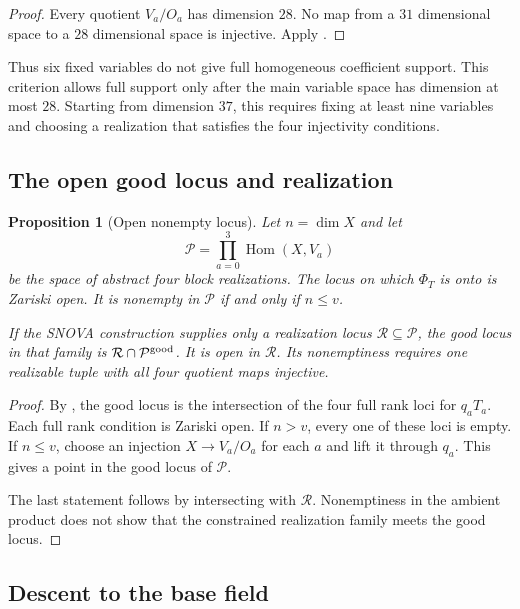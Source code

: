 \documentclass[11pt]{article}
\newcommand{\Hom}{\operatorname{Hom}}
\theoremstyle{plain}
\newtheorem{proposition}[theorem]{Proposition}
\theoremstyle{definition}
\theoremstyle{remark}
\begin{document}
\begin{proof}
Every quotient $V_a/O_a$ has dimension $28$.  No map from a
$31$ dimensional space to a $28$ dimensional space is injective.  Apply
.
\end{proof}

Thus six fixed variables do not give full homogeneous coefficient support.
This criterion allows full support only after the main variable space has
dimension at most $28$.  Starting from dimension $37$, this requires fixing
at least nine variables and choosing a realization that satisfies the four
injectivity conditions.

\subsection{The open good locus and realization}

\begin{proposition}[Open nonempty locus]
\label{prop:l4-open-locus}
Let $n=\dim X$ and let
\[
 \mathcal P=\prod_{a=0}^3\Hom(X,V_a)
\]
be the space of abstract four block realizations.  The locus on which
$\Phi_T$ is onto is Zariski open.  It is nonempty in $\mathcal P$ if and only
if $n\leq v$.

If the SNOVA construction supplies only a realization locus
$\mathcal R\subseteq\mathcal P$, the good locus in that family is
$\mathcal R\cap\mathcal P^{\rm good}$.  It is open in $\mathcal R$.  Its
nonemptiness requires one realizable tuple with all four quotient maps
injective.
\end{proposition}

\begin{proof}
By , the good locus is the intersection of
the four full rank loci for $q_aT_a$.  Each full rank condition is Zariski
open.  If $n>v$, every one of these loci is empty.  If $n\leq v$, choose an
injection $X\to V_a/O_a$ for each $a$ and lift it through $q_a$.  This gives
a point in the good locus of $\mathcal P$.

The last statement follows by intersecting with $\mathcal R$.  Nonemptiness
in the ambient product does not show that the constrained realization family
meets the good locus.
\end{proof}

\subsection{Descent to the base field}
\end{document}
